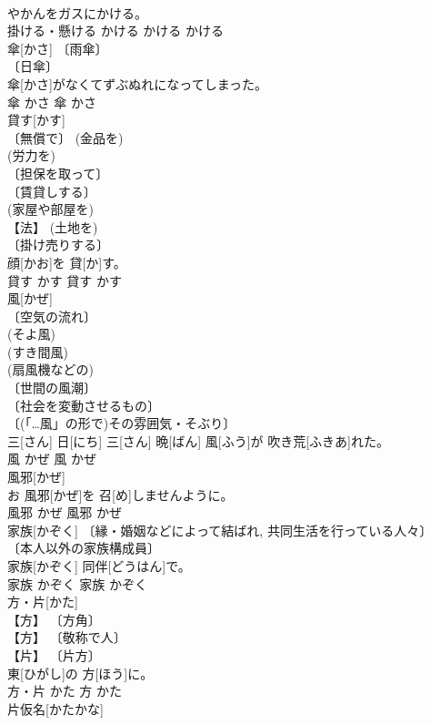 \documentclass[8pt]{extreport}
\begin{document}
\begin{CJK}{UTF8}{min}
\\	やかんをガスにかける。	
\\	掛ける・懸ける	かける	かける	かける	
\\	傘[かさ]	〔雨傘〕 
\\	〔日傘〕 
\\	傘[かさ]がなくてずぶぬれになってしまった。	
\\	傘	かさ	傘	かさ	
\\	貸す[かす]	
\\	〔無償で〕 (金品を) 
\\	(労力を) 
\\	〔担保を取って〕 
\\	〔賃貸しする〕 
\\	(家屋や部屋を) 
\\	【法】 (土地を) 
\\	〔掛け売りする〕 
\\	顔[かお]を 貸[か]す。	
\\	貸す	かす	貸す	かす	
\\	風[かぜ]	
\\	〔空気の流れ〕 
\\	(そよ風) 
\\	(すき間風) 
\\	(扇風機などの) 
\\	〔世間の風潮〕 
\\	〔社会を変動させるもの〕 
\\	〔(「…風」の形で)その雰囲気・そぶり〕 
\\	三[さん] 日[にち] 三[さん] 晩[ばん] 風[ふう]が 吹き荒[ふきあ]れた。	
\\	風	かぜ	風	かぜ	
\\	風邪[かぜ]	
\\	お 風邪[かぜ]を 召[め]しませんように。	
\\	風邪	かぜ	風邪	かぜ	
\\	家族[かぞく]	〔縁・婚姻などによって結ばれ, 共同生活を行っている人々〕 
\\	〔本人以外の家族構成員〕 
\\	家族[かぞく] 同伴[どうはん]で。	
\\	家族	かぞく	家族	かぞく	
\\	方・片[かた]	
\\	【方】 〔方角〕 
\\	【方】 〔敬称で人〕 
\\	【片】 〔片方〕 
\\	東[ひがし]の 方[ほう]に。	
\\	方・片	かた	方	かた	
\\	片仮名[かたかな]	

\end{CJK}
\end{document}
